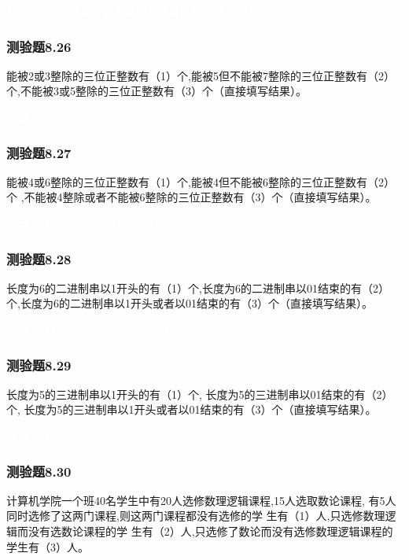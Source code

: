 \documentclass[UTF8, heading=true]{ctexart}
\begin{document}
\textcolor{white}{解析：A选项结果计算正确但是计算过程有误,应该是$|A|=\lfloor 999 / 2\rfloor - \lfloor 99 / 2\rfloor=450$}

\subsubsection{测验题8.26}


能被2或3整除的三位正整数有（1）个,能被5但不能被7整除的三位正整数有（2）个,不能被3或5整除的三位正整数有（3）个（直接填写结果）。

\textcolor{white}{答案：（1） 600 （2） 154 （3） 480}

\subsubsection{测验题8.27}
能被4或6整除的三位正整数有（1）个,能被4但不能被6整除的三位正整数有（2）个
,不能被4整除或者不能被6整除的三位正整数有（3）个（直接填写结果）。

\textcolor{white}{答案：（1） 300 （2） 150 （3） 825}

\subsubsection{测验题8.28}

长度为6的二进制串以1开头的有（1）个,长度为6的二进制串以01结束的有（2）个,长度为6的二进制串以1开头或者以01结束的有（3）个（直接填写结果）。

\textcolor{white}{答案：（1） 32 （2） 16 （3） 40}

\subsubsection{测验题8.29}

长度为5的三进制串以1开头的有（1）个,
长度为5的三进制串以01结束的有（2）个,
长度为5的三进制串以1开头或者以01结束的有（3）个（直接填写结果）。

\textcolor{white}{答案：（1） 81 （2） 27 （3） 99}

\subsubsection{测验题8.30}

计算机学院一个班40名学生中有20人选修数理逻辑课程,15人选取数论课程,
有5人同时选修了这两门课程,则这两门课程都没有选修的学
生有（1）人,只选修数理逻辑而没有选数论课程的学
生有（2）人,只选修了数论而没有选修数理逻辑课程的学生有（3）人。
\end{document}
